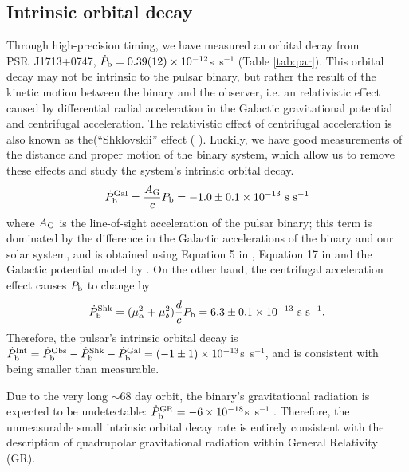 \subsection{Intrinsic orbital decay}
\label{sec:obdecay}
Through high-precision timing, we have measured an orbital decay from PSR~J1713+0747, $\dot{P}_{\rm b} =
0.39(12)\times10^{-12}$s~s$^{-1}$ (Table \ref{tab:par}).
This orbital decay may not be intrinsic to the pulsar binary, but rather the
result of the kinetic motion between the binary and the
observer, i.e. an relativistic effect caused by differential radial
acceleration in the Galactic gravitational potential
\citep{dt91} and centrifugal acceleration. The relativistic effect of centrifugal
acceleration is also known as the(``Shklovskii'' effect (
\citealt{shk70}). Luckily, we have good measurements of the distance and proper
motion of the binary system, which allow us to remove these effects and study the system's intrinsic orbital decay.
\begin{equation}
\dot{P}_{\rm b}^{\rm Gal} = \frac{A_{\rm G}}{c} P_{\rm b} =
-1.0\pm0.1\times10^{-13}~{\rm s~s^{-1}}
\end{equation}
where $A_{\rm G}$ is the line-of-sight acceleration of the pulsar binary;
this term is dominated by the difference in the Galactic accelerations of the
binary and our solar system, and is obtained using
Equation 5 in \citet{nt95}, Equation 17 in \citet{lwj+09} and the Galactic
potential model by \citet{hf04a}.
On the other hand, the centrifugal acceleration effect causes $P_{\rm b}$ to
change by
\begin{equation}
\dot{P}_{\rm b}^{\rm Shk} = (\mu_{\alpha}^2+\mu_{\delta}^2)\frac{d}{c}P_{\rm
b} = 6.3\pm0.1\times10^{-13}~{\rm s~s^{-1}}.
\end{equation}
Therefore, the pulsar's intrinsic orbital decay is $\dot{P}_{\rm b}^{\rm Int}
= \dot{P}_{\rm b}^{\rm Obs} - \dot{P}_{\rm b}^{\rm Shk} - \dot{P}_{\rm b}^{\rm
Gal} = (-1\pm1)\times10^{-13}$s~s$^{-1}$, and is consistent with being smaller than measurable.

Due to the very long $\sim$68 day orbit, the binary's gravitational
radiation is expected to be undetectable: $\dot{P}_{\rm b}^{\rm GR} =
-6\times10^{-18}$s~s$^{-1}$ \citep{lk05}.  Therefore, the unmeasurable small 
intrinsic orbital decay rate is entirely consistent with the
description of quadrupolar gravitational radiation within General
Relativity (GR).

